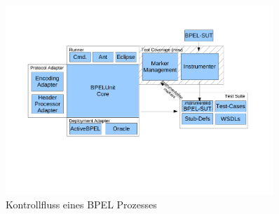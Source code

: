  
 \begin{figure}[htbp]
	\centering
		\includegraphics[width=0.9\textwidth]{bilder/bpelunit-architecture-with-coverage.pdf}
		\caption{Kontrollfluss eines BPEL Prozesses}
	\label{fig:ExamlpleBPELProzess}
\end{figure}